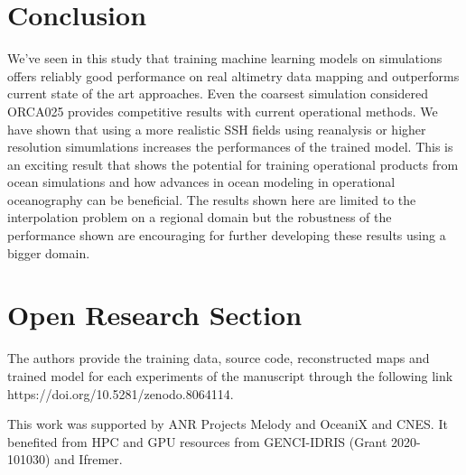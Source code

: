 \documentclass[draft]{agujournal2019}
\begin{document}
\section{Conclusion}
\label{sec:conclusion}
We've seen in this study that training machine learning models on simulations offers reliably good performance on real altimetry data mapping and outperforms current state of the art approaches. Even the coarsest simulation considered ORCA025 provides competitive results with current operational methods. We have shown that using a more realistic SSH fields using reanalysis or higher resolution simumlations increases the performances of the trained model. This is an exciting result that shows the potential for training operational products from ocean simulations and how advances in ocean modeling in operational oceanography can be beneficial. The results shown here are limited to the interpolation problem on a regional domain but the robustness of the performance shown are encouraging for further developing these results using a bigger domain.



\section*{Open Research Section}
The authors provide the training data, source code, reconstructed maps and trained model for each experiments of the manuscript through the following link https://doi.org/10.5281/zenodo.8064114.



\acknowledgments
This work was supported by ANR Projects Melody and OceaniX and CNES. It benefited from HPC and GPU resources from GENCI-IDRIS (Grant 2020-101030) and Ifremer.



\end{document}
